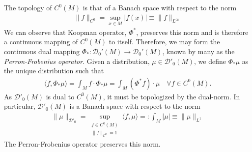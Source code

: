 \documentclass[12pt]{amsart}
\begin{document}
The topology of $C^0(M)$ is that of a Banach space with respect to the norm
\begin{align*}
	\| f \|_{C^0} = \sup_{x \in M} | f(x) | \equiv \| f \|_{L^\infty}
\end{align*}
We can observe that Koopman operator, $\Phi^*$, preserves this norm and is therefore
a continuous mapping of $C^0(M)$ to itself.
Therefore, we may form the continuous dual mapping $\Phi_*: \mathcal{D}_0'(M) \to \mathcal{D}_0'(M)$,
known by many as the \emph{Perron-Frobenius operator}.
Given a distribution, $\mu \in \mathcal{D}'_0(M)$, we define $\Phi_* \mu$ as the unique distribution such that
\begin{align*}
	\langle f , \Phi_*\mu \rangle = \int_M f \cdot \Phi_* \mu = \int_M (\Phi^*f ) \cdot \mu \quad \forall f \in C^0(M).
\end{align*}
As $\mathcal{D}'_0(M)$ is dual to $C^0(M)$, it must be topologized by the dual-norm.
In particular, $\mathcal{D}'_0(M)$ is a Banach space with respect to the norm
\begin{align*}
	\| \mu \|_{\mathcal{D}'_0} = \sup_{
		\substack{
				f \in C^0(M) \\
				\| f \|_{C^0} = 1
		}
	} \langle f , \mu \rangle =: \int_M | \mu | \equiv \| \mu \|_{L^1}
\end{align*}
The Perron-Frobenius operator preserves this norm.
\end{document}
